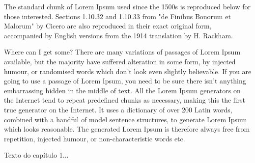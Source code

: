 \documentclass{article}
\begin{document}
The standard chunk of Lorem Ipsum used since the 1500s is reproduced below for those interested. Sections 1.10.32 and 1.10.33 from "de Finibus Bonorum et Malorum" by Cicero are also reproduced in their exact original form, accompanied by English versions from the 1914 translation by H. Rackham.

Where can I get some?
There are many variations of passages of Lorem Ipsum available, but the majority have suffered alteration in some form, by injected humour, or randomised words which don't look even slightly believable. If you are going to use a passage of Lorem Ipsum, you need to be sure there isn't anything embarrassing hidden in the middle of text. All the Lorem Ipsum generators on the Internet tend to repeat predefined chunks as necessary, making this the first true generator on the Internet. It uses a dictionary of over 200 Latin words, combined with a handful of model sentence structures, to generate Lorem Ipsum which looks reasonable. The generated Lorem Ipsum is therefore always free from repetition, injected humour, or non-characteristic words etc.

Texto do capítulo 1...
\end{document}
